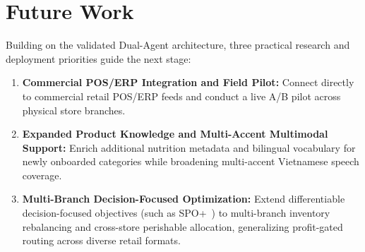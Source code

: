 \section{Future Work}

Building on the validated Dual-Agent architecture, three practical research and deployment priorities guide the next stage:
\begin{enumerate}
    \item \textbf{Commercial POS/ERP Integration and Field Pilot:} Connect  directly to commercial retail POS/ERP feeds and conduct a live A/B pilot across physical store branches.
    \item \textbf{Expanded Product Knowledge and Multi-Accent Multimodal Support:} Enrich additional nutrition metadata and bilingual vocabulary for newly onboarded categories while broadening multi-accent Vietnamese speech coverage.
    \item \textbf{Multi-Branch Decision-Focused Optimization:} Extend differentiable decision-focused objectives (such as SPO+~\cite{elmachtoub2022spo}) to multi-branch inventory rebalancing and cross-store perishable allocation, generalizing profit-gated routing across diverse retail formats.
\end{enumerate}
